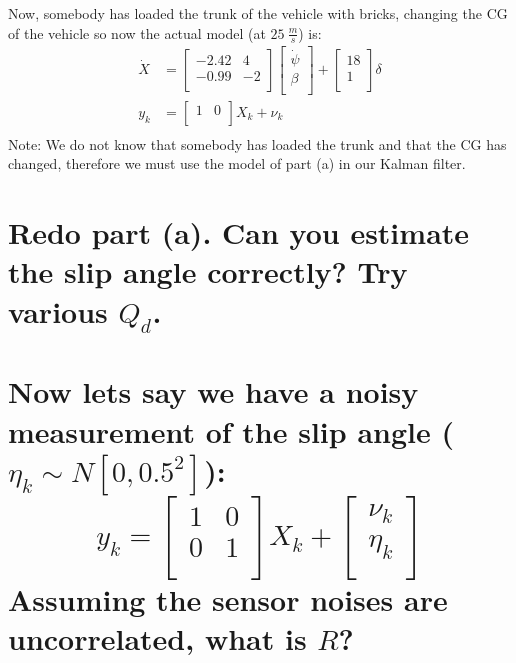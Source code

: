 \documentclass[12pt,letterpaper, onecolumn]{exam}
\begin{document}
\begin{questions}
\begin{parts}
{            Now, somebody has loaded the trunk of the vehicle with bricks, changing the CG of the vehicle so now the actual model (at $25~\frac{m}{s}$) is:
            \begin{equation*}
                \begin{split}
                    \dot{X} & =
                    \begin{bmatrix}
                        -2.42 & 4  \\
                        -0.99 & -2 \\
                    \end{bmatrix}
                    \begin{bmatrix}
                        \dot{\psi} \\
                        \beta      \\
                    \end{bmatrix} +
                    \begin{bmatrix}
                        18 \\
                        1  \\
                    \end{bmatrix} \delta\\
                    y_k & =
                    \begin{bmatrix}
                        1 & 0 \\
                    \end{bmatrix}
                    X_k + \nu_k\\
                \end{split}
            \end{equation*}
            Note: We do not know that somebody has loaded the trunk and that the CG has changed, therefore we must use the model of part (a) in our Kalman filter.
        }

        \part{Redo part (a). Can you estimate the slip angle correctly? Try various $Q_d$.}

        \part{Now lets say we have a noisy measurement of the slip angle ($\eta_k \sim N\left[0,0.5^2\right]$):
            \[
                y_k =
                \begin{bmatrix}
                    1 & 0 \\
                    0 & 1 \\
                \end{bmatrix} X_k +
                \begin{bmatrix}
                    \nu_k  \\
                    \eta_k \\
                \end{bmatrix}
            \]
            Assuming the sensor noises are uncorrelated, what is $R$?}


\end{parts}
\end{questions}
\end{document}
